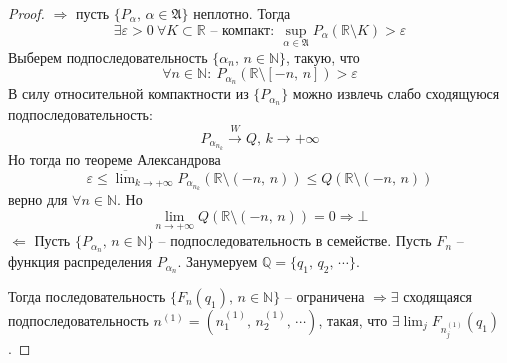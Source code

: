 \begin{proof}
  $\Rightarrow$ пусть $\{P_\alpha,\, \alpha \in \mathfrak{A}\}$ неплотно. Тогда
  \[\exists \varepsilon > 0 \: \forall K \subset \mathbb{R} \text{ -- компакт}:\: \sup_{\alpha \in \mathfrak{A}}P_\alpha(\mathbb{R} \setminus K) > \varepsilon\]
  Выберем подпоследовательность $\{\alpha_n,\, n \in \mathbb{N}\}$, такую, что
  \[\forall n \in \mathbb{N} :\: P_{\alpha_n}(\mathbb{R} \setminus [-n,\, n]) > \varepsilon\]
  В силу относительной компактности из $\{P_{\alpha_n}\}$ можно извлечь слабо сходящуюся подпоследовательность:
  \[P_{\alpha_{n_k}} \stackrel{W}{\to} Q,\, k \to +\infty\]
  Но тогда по теореме Александрова
  \[\varepsilon \leq \overline{\lim}_{k \to +\infty}P_{\alpha_{n_k}}(\mathbb{R}\setminus(-n,\,n)) \leq Q(\mathbb{R} \setminus(-n,\,n))\]
  верно для $\forall n \in \mathbb{N}$. Но
  \[\lim_{n \to +\infty} Q(\mathbb{R} \setminus (-n,\, n)) = 0 \Rightarrow \bot\]
  $\Leftarrow$ Пусть $\{P_{\alpha_n},\, n \in \mathbb{N}\}$ -- подпоследовательность в семействе. Пусть $F_n$ -- функция распределения $P_{\alpha_n}$. Занумеруем $\mathbb{Q} = \{q_1,\,q_2,\,\cdots\}$.

  Тогда последовательность $\{F_n(q_1),\, n \in \mathbb{N}\}$ -- ограничена $\Rightarrow \exists$ сходящаяся подпоследовательность $n^{(1)} = (n^{(1)}_1,\,n^{(1)}_2,\,\cdots)$, такая, что $\exists\lim_j F_{n^{(1)}_j}(q_1)$. 
  

\end{proof}
